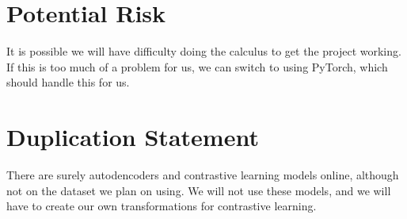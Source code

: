 \documentclass{article}
\begin{document}
\section{Potential Risk}
It is possible we will have difficulty doing the calculus to get the project working. If this is too much of a problem for us, we can switch to using PyTorch, which should handle this for us.  

\section{Duplication Statement}


There are surely autodencoders and contrastive learning models online, although not on the dataset we plan on using.  We will not use these models, and we will have to create our own transformations for contrastive learning.



\end{document}
